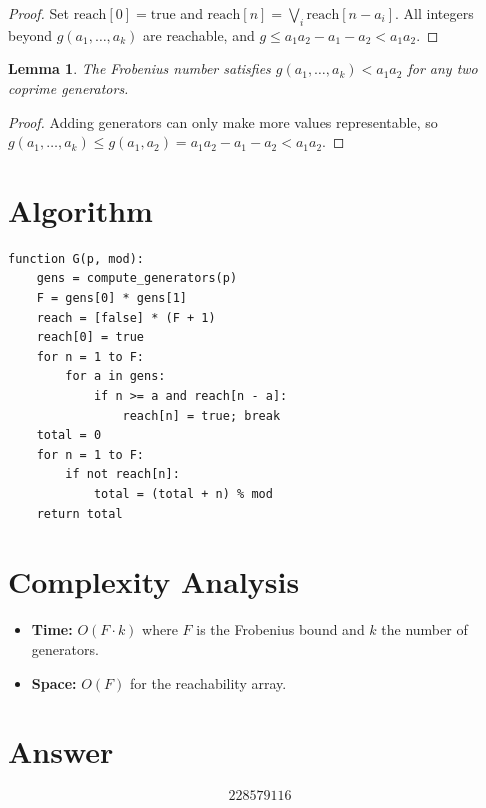 \documentclass[11pt]{article}
\newtheorem{lemma}[theorem]{Lemma}
\begin{document}
\begin{proof}
Set $\mathrm{reach}[0]=\mathrm{true}$ and $\mathrm{reach}[n]=\bigvee_i \mathrm{reach}[n-a_i]$. All integers beyond $g(a_1,\ldots,a_k)$ are reachable, and $g \le a_1 a_2 - a_1 - a_2 < a_1 a_2$.
\end{proof}

\begin{lemma}
The Frobenius number satisfies $g(a_1,\ldots,a_k) < a_1 a_2$ for any two coprime generators.
\end{lemma}

\begin{proof}
Adding generators can only make more values representable, so $g(a_1,\ldots,a_k) \le g(a_1,a_2) = a_1 a_2 - a_1 - a_2 < a_1 a_2$.
\end{proof}

\section{Algorithm}

\begin{verbatim}
function G(p, mod):
    gens = compute_generators(p)
    F = gens[0] * gens[1]
    reach = [false] * (F + 1)
    reach[0] = true
    for n = 1 to F:
        for a in gens:
            if n >= a and reach[n - a]:
                reach[n] = true; break
    total = 0
    for n = 1 to F:
        if not reach[n]:
            total = (total + n) % mod
    return total
\end{verbatim}

\section{Complexity Analysis}

\begin{itemize}
    \item \textbf{Time:} $O(F \cdot k)$ where $F$ is the Frobenius bound and $k$ the number of generators.
    \item \textbf{Space:} $O(F)$ for the reachability array.
\end{itemize}

\section{Answer}

\[
\boxed{228579116}
\]
\end{document}
